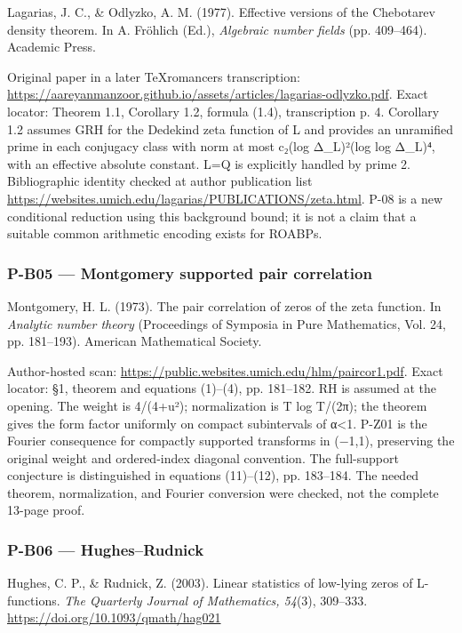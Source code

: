 \documentclass[11pt,a4paper]{article}
\theoremstyle{definition}\newtheorem{definition}{Definition}
\begin{document}
Lagarias, J. C., \& Odlyzko, A. M. (1977). Effective versions of the
Chebotarev density theorem. In A. Fröhlich (Ed.), \emph{Algebraic number
fields} (pp. 409--464). Academic Press.

Original paper in a later TeXromancers transcription:
\url{https://aareyanmanzoor.github.io/assets/articles/lagarias-odlyzko.pdf}.
Exact locator: Theorem 1.1, Corollary 1.2, formula (1.4), transcription
p. 4. Corollary 1.2 assumes GRH for the Dedekind zeta function of L and
provides an unramified prime in each conjugacy class with norm at most
c₂(log Δ\_L)²(log log Δ\_L)⁴, with an effective absolute constant. L=Q
is explicitly handled by prime 2. Bibliographic identity checked at
author publication list
\url{https://websites.umich.edu/lagarias/PUBLICATIONS/zeta.html}. P-08
is a new conditional reduction using this background bound; it is not a
claim that a suitable common arithmetic encoding exists for ROABPs.

\subsubsection{P-B05 --- Montgomery supported pair
correlation}\label{p-b05--montgomery-supported-pair-correlation}

Montgomery, H. L. (1973). The pair correlation of zeros of the zeta
function. In \emph{Analytic number theory} (Proceedings of Symposia in
Pure Mathematics, Vol. 24, pp. 181--193). American Mathematical Society.

Author-hosted scan:
\url{https://public.websites.umich.edu/hlm/paircor1.pdf}. Exact locator:
§1, theorem and equations (1)--(4), pp. 181--182. RH is assumed at the
opening. The weight is 4/(4+u²); normalization is T log T/(2π); the
theorem gives the form factor uniformly on compact subintervals of
\textbar α\textbar\textless1. P-Z01 is the Fourier consequence for
compactly supported transforms in (−1,1), preserving the original weight
and ordered-index diagonal convention. The full-support conjecture is
distinguished in equations (11)--(12), pp. 183--184. The needed theorem,
normalization, and Fourier conversion were checked, not the complete
13-page proof.

\subsubsection{P-B06 --- Hughes--Rudnick}\label{p-b06--hughesrudnick}

Hughes, C. P., \& Rudnick, Z. (2003). Linear statistics of low-lying
zeros of L-functions. \emph{The Quarterly Journal of Mathematics,
54}(3), 309--333. \url{https://doi.org/10.1093/qmath/hag021}
\end{document}
